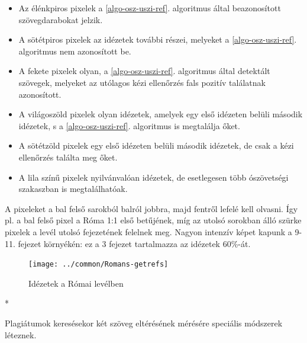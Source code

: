 \documentclass{article}
\begin{document}
\begin{itemize}
\item Az élénkpiros pixelek a \ref{algo-osz-uszi-ref}. algoritmus által beazonosított
szövegdarabokat jelzik.
\item A sötétpiros pixelek az idézetek további részei, melyeket a \ref{algo-osz-uszi-ref}.
algoritmus nem azonosított be.
\item A fekete pixelek olyan, a \ref{algo-osz-uszi-ref}. algoritmus által detektált
szövegek, melyeket az utólagos kézi ellenőrzés fals pozitív találatnak azonosított.
\item A világoszöld pixelek olyan idézetek, amelyek egy első idézeten belüli
második idézetek, s a \ref{algo-osz-uszi-ref}. algoritmus is megtalálja őket.
\item A sötétzöld pixelek egy első idézeten belüli második idézetek, de csak
a kézi ellenőrzés találta meg őket.
\item A lila színű pixelek nyilvánvalóan idézetek, de esetlegesen több ószövetségi szakaszban
is megtalálhatóak.
\end{itemize}

A pixeleket a bal felső sarokból balról jobbra, majd fentről lefelé kell olvasni. Így pl.
a bal felső pixel a Róma 1:1 első betűjének, míg az utolsó sorokban álló szürke pixelek
a levél utolsó fejezetének felelnek meg. Nagyon intenzív képet kapunk a 9-11. fejezet
környékén: ez a 3 fejezet tartalmazza az idézetek 60\%-át.

\begin{figure}
\begin{center}
\texttt{[image: ../common/Romans-getrefs]}
\caption{Idézetek a Római levélben}
\label{Rom-getrefs}
\end{center}
\end{figure}

\begin{center} *
\end{center}


Plagiátumok keresésekor két szöveg eltérésének mérésére speciális módszerek léteznek.
\end{document}
